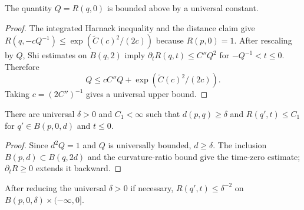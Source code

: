 \begin{claim}\label{claim:curvature-upper-bound-universal}
\label{zkbound}

The quantity $Q=R(q,0)$ is bounded above by a universal constant.
\end{claim}
\begin{proof}
\sketch
{}
The integrated Harnack inequality and the distance claim give
$R(q,-cQ^{-1})\leq\exp(\widetilde C(c)^2/(2c))$ because
$R(p,0)=1$. After rescaling by $Q$, Shi estimates on $B(q,2)$ imply
$\partial_tR(q,t)\leq C''Q^2$ for $-Q^{-1}<t\leq0$. Therefore
\[
 Q\leq cC''Q+\exp(\widetilde C(c)^2/(2c)).
\]
Taking $c=(2C'')^{-1}$ gives a universal upper bound.
\end{proof}

\begin{claim}\label{claim:basepoint-neighborhood-curvature-bound}
\label{bdnearxk}

There are universal $\delta>0$ and $C_1<\infty$ such that
$d(p,q)\geq\delta$ and $R(q',t)\leq C_1$ for
$q'\in B(p,0,d)$ and $t\leq0$.
\end{claim}
\begin{proof}
\sketch Since $d^2Q=1$ and $Q$ is universally bounded,
$d\geq\delta$. The inclusion $B(p,d)\subset B(q,2d)$ and the
curvature-ratio bound give the time-zero estimate; $\partial_tR\geq0$
extends it backward.
\end{proof}

\begin{corollary}\label{cor:curvature-bound-fixed-ball}
\label{rho}

After reducing the universal $\delta>0$ if necessary,
$R(q',t)\leq\delta^{-2}$ on
$B(p,0,\delta)\times(-\infty,0]$.
\end{corollary}

